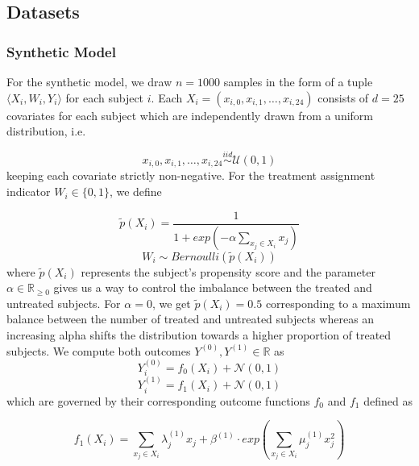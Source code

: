 \subsection{Datasets}
\subsubsection{Synthetic Model} \label{sec:synthetic-model}
For the synthetic model, we draw $n = 1000$ samples in the form of a tuple $\langle X_i, W_i, Y_i \rangle$ for each subject $i$. Each $X_i = (x_{i,0}, x_{i,1}, \ldots, x_{i,24})$ consists of $d = 25$ covariates for each subject which are independently drawn from a uniform distribution, i.e.  

\begin{equation}
x_{i,0}, x_{i,1}, \ldots, x_{i,24} \overset{iid}{\sim} \mathcal{U}(0, 1)
\end{equation}
keeping each covariate strictly non-negative. For the treatment assignment indicator $W_i \in \{0,1\}$, we define

\begin{equation}
\tilde{p}(X_i) =  \frac{1}{1 + exp(- \alpha\sum \limits_{{x_{j} \in X_i}} x_j)} %
\end{equation}
\begin{equation}
W_i \sim Bernoulli(\tilde{p}(X_i))
\end{equation}
where $\tilde{p}(X_i)$ represents the subject's propensity score and the parameter $\alpha \in \mathbb{R}_{\geq0}$ gives us a way to control the imbalance between the treated and untreated subjects. For $\alpha = 0$, we get $\tilde{p}(X_i) = 0.5$ corresponding to a maximum balance between the number of treated and untreated subjects whereas an increasing alpha shifts the distribution towards a higher proportion of treated subjects.
We compute both outcomes $Y^{(0)}, Y^{(1)} \in \mathbb{R}$ as
\begin{equation}
Y^{(0)}_i = f_0(X_i) + \mathcal{N}(0, 1)
\end{equation}
\begin{equation}
Y^{(1)}_i = f_1(X_i) + \mathcal{N}(0, 1)
\end{equation}
which are governed by their corresponding outcome functions $f_0$ and $f_1$ defined as


\begin{equation}
f_1(X_i) = \sum \limits_{{x_{j} \in X_i}} \lambda^{(1)}_j x_j +  \beta^{(1)} \cdot exp(\sum \limits_{{x_{j} \in X_i}} \mu^{(1)}_j x_j^2)
\end{equation}

